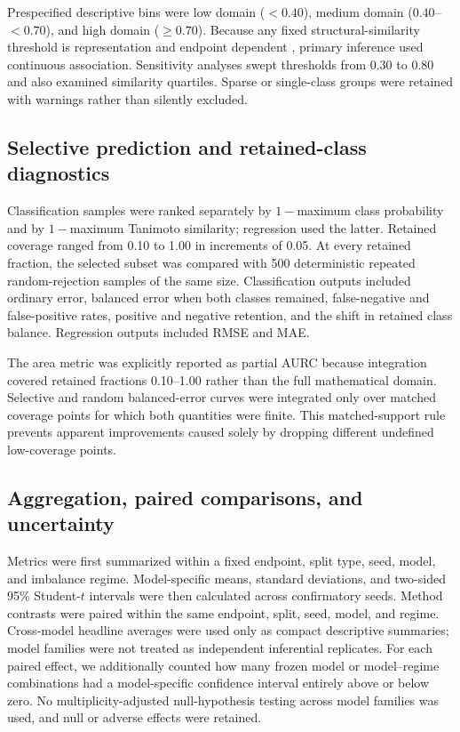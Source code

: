 Prespecified descriptive bins were low domain ($<0.40$), medium domain ($0.40$--$<0.70$), and high domain ($\geq0.70$). Because any fixed structural-similarity threshold is representation and endpoint dependent \citep{kim2025distance}, primary inference used continuous association. Sensitivity analyses swept thresholds from 0.30 to 0.80 and also examined similarity quartiles. Sparse or single-class groups were retained with warnings rather than silently excluded.

\subsection{Selective prediction and retained-class diagnostics}

Classification samples were ranked separately by $1-$maximum class probability and by $1-$maximum Tanimoto similarity; regression used the latter. Retained coverage ranged from 0.10 to 1.00 in increments of 0.05. At every retained fraction, the selected subset was compared with 500 deterministic repeated random-rejection samples of the same size. Classification outputs included ordinary error, balanced error when both classes remained, false-negative and false-positive rates, positive and negative retention, and the shift in retained class balance. Regression outputs included RMSE and MAE.

The area metric was explicitly reported as partial AURC because integration covered retained fractions 0.10--1.00 rather than the full mathematical domain. Selective and random balanced-error curves were integrated only over matched coverage points for which both quantities were finite. This matched-support rule prevents apparent improvements caused solely by dropping different undefined low-coverage points.

\subsection{Aggregation, paired comparisons, and uncertainty}

Metrics were first summarized within a fixed endpoint, split type, seed, model, and imbalance regime. Model-specific means, standard deviations, and two-sided 95\% Student-$t$ intervals were then calculated across confirmatory seeds. Method contrasts were paired within the same endpoint, split, seed, model, and regime. Cross-model headline averages were used only as compact descriptive summaries; model families were not treated as independent inferential replicates. For each paired effect, we additionally counted how many frozen model or model--regime combinations had a model-specific confidence interval entirely above or below zero. No multiplicity-adjusted null-hypothesis testing across model families was used, and null or adverse effects were retained.

